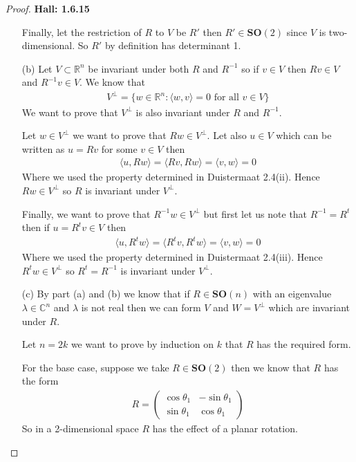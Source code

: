 \documentclass[11pt]{article}
\newcommand{\R}{\mathbb{R}}
\newcommand{\C}{\mathbb{C}}
\newcommand{\inprd}[1]{\langle{#1}\rangle}
\theoremstyle{definition}
\begin{document}
\begin{proof}{\textbf{Hall: 1.6.15}}
\begin{itemize}
    Finally, let the restriction of $R$ to $V$  be $R'$ then
    $R' \in \bm{SO}(2)$ since $V$ is two-dimensional. So $R'$ by definition
    has determinant 1.

\cleardoublepage
    \item [(b)] Let $V\subset \R^n$ be invariant under both $R$ and $R^{-1}$
    so if $v \in V$ then $Rv \in V$ and $R^{-1}v \in V$.
    We know that
    \begin{align*}
        V^\perp = \{w \in \R^n :\inprd{w,v} = 0 \text{ for all }v \in V\}
    \end{align*}
    We want to prove that $V^\perp$ is also invariant under $R$ and $R^{-1}$.

    Let $w \in V^\perp$ we want to prove that $Rw \in V^\perp$. Let also
    $u\in V$ which can be written as $u = Rv$ for some $v \in V$ then
    \begin{align*}
        \inprd{u, Rw} = \inprd{Rv, Rw} = \inprd{v, w} = 0
    \end{align*}
    Where we used the property determined in Duistermaat 2.4(ii). Hence 
    $Rw \in V^\perp$ so $R$ is invariant under $V^\perp$.

    Finally, we want to prove that $R^{-1}w \in V^\perp$ but first let us note
    that $R^{-1} = R^t$ then if $u = R^tv \in V$ then
    \begin{align*}
        \inprd{u, R^tw} = \inprd{R^tv, R^tw} = \inprd{v, w} = 0
    \end{align*}
    Where we used the property determined in Duistermaat 2.4(iii). Hence 
    $R^tw \in V^\perp$ so $R^t = R^{-1}$ is invariant under $V^\perp$.

\cleardoublepage
    \item [(c)] By part (a) and (b) we know that if $R \in \bm{SO}(n)$ with an
    eigenvalue $\lambda \in \C^n$ and $\lambda$ is not real then we can form
    $V$ and $W = V^\perp$ which are invariant under $R$.

    Let $n = 2k$ we want to prove by induction on $k$ that $R$ has the required
    form.
    
    For the base case, suppose we take $R \in \bm{SO}(2)$ then we know that
    $R$ has the form
    \begin{align*}
        R = \begin{pmatrix}
            \cos\theta_1 & -\sin\theta_1\\
            \sin\theta_1 & \cos\theta_1
        \end{pmatrix}
    \end{align*}
    So in a 2-dimensional space $R$ has the effect of a planar rotation.


\end{itemize}
\end{proof}
\end{document}

